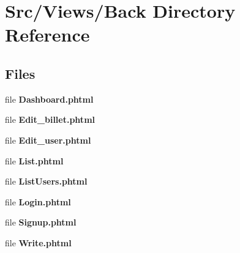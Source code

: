 \section{Src/\+Views/\+Back Directory Reference}
\label{dir_228496b251bd7aff9b8624d2d669e686}
\subsection*{Files}
\begin{DoxyCompactItemize}
\item 
file \textbf{ Dashboard.\+phtml}
\item 
file \textbf{ Edit\+\_\+billet.\+phtml}
\item 
file \textbf{ Edit\+\_\+user.\+phtml}
\item 
file \textbf{ List.\+phtml}
\item 
file \textbf{ List\+Users.\+phtml}
\item 
file \textbf{ Login.\+phtml}
\item 
file \textbf{ Signup.\+phtml}
\item 
file \textbf{ Write.\+phtml}
\end{DoxyCompactItemize}
